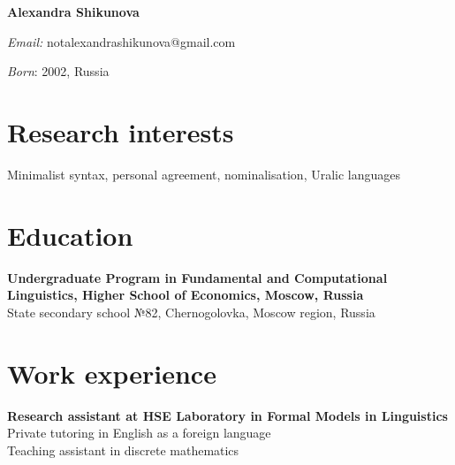 \documentclass[11pt]{article} %
\begin{document}

{\LARGE\bfseries Alexandra Shikunova} %
\bigskip\bigskip\medskip %

\textit{Email:}
notalexandrashikunova@gmail.com
\medskip %


\textit{Born}: 2002, Russia %


\section*{Research interests}

Minimalist syntax, personal agreement, nominalisation, Uralic languages %



\section*{Education}

\textbf{Undergraduate Program in Fundamental and Computational Linguistics, Higher School of Economics, Moscow, Russia}\\
State secondary school №82, Chernogolovka, Moscow region, Russia


\section*{Work experience}

\textbf{Research assistant at HSE Laboratory in Formal Models in Linguistics}\\
Private tutoring in English as a foreign language\\
Teaching assistant in discrete mathematics
\end{document}
